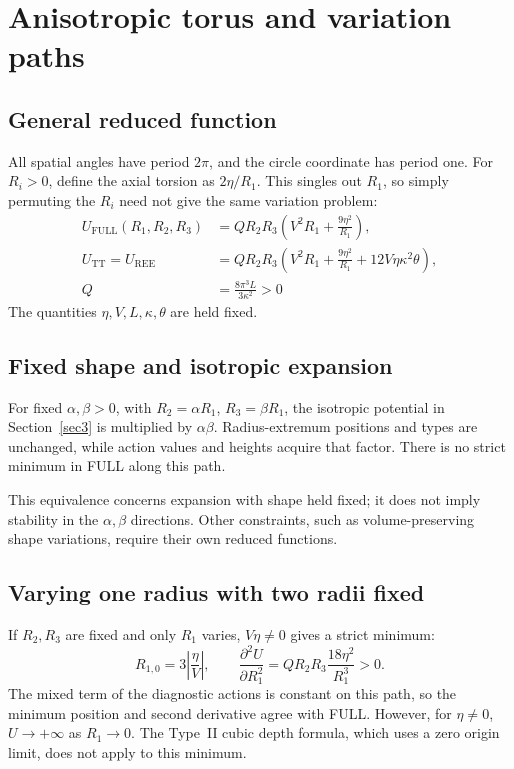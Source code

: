 \section{Anisotropic torus and variation paths}\label{appE}
\subsection{General reduced function}
All spatial angles have period $2\pi$, and the circle coordinate has
period one. For $R_i>0$, define the axial torsion as $2\eta/R_1$.
This singles out $R_1$, so simply permuting the $R_i$ need not give
the same variation problem:
\begin{equation}
\begin{aligned}
U_{\mathrm{FULL}}(R_1,R_2,R_3)
 &=Q R_2R_3\left(V^2R_1+\frac{9\eta^2}{R_1}\right),\\
U_{\mathrm{TT}}=U_{\mathrm{REE}}
 &=Q R_2R_3\left(V^2R_1+\frac{9\eta^2}{R_1}
                 +12V\eta\kappa^2\theta\right),\\
Q&=\frac{8\pi^3L}{3\kappa^2}>0
\end{aligned}
\tag{E-01}\label{eq:E-01}
\end{equation}
The quantities $\eta,V,L,\kappa,\theta$ are held fixed.

\subsection{Fixed shape and isotropic expansion}
For fixed $\alpha,\beta>0$, with $R_2=\alpha R_1$, $R_3=\beta R_1$,
the isotropic potential in Section~\ref{sec3} is multiplied by
$\alpha\beta$. Radius-extremum positions and types are unchanged,
while action values and heights acquire that factor.
There is no strict minimum in FULL along this path.

This equivalence concerns expansion with shape held fixed; it does not
imply stability in the $\alpha,\beta$ directions.
Other constraints, such as volume-preserving shape variations, require
their own reduced functions.

\subsection{Varying one radius with two radii fixed}
If $R_2,R_3$ are fixed and only $R_1$ varies, $V\eta\ne0$ gives
a strict minimum:
\begin{equation}
R_{1,0}=3\left\lvert\frac{\eta}{V}\right\rvert,\qquad
\frac{\partial^2U}{\partial R_1^2}
=Q R_2R_3\frac{18\eta^2}{R_1^3}>0.
\tag{E-02}\label{eq:E-02}
\end{equation}
The mixed term of the diagnostic actions is constant on this path,
so the minimum position and second derivative agree with FULL.
However, for $\eta\ne0$, $U\to+\infty$ as $R_1\to0$.
The Type~II cubic depth formula, which uses a zero origin limit,
does not apply to this minimum.

